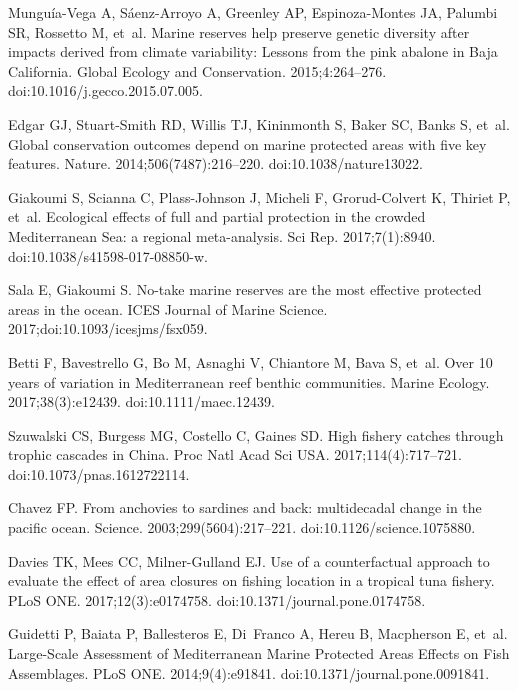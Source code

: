 \documentclass[10pt,letterpaper]{article}
\begin{document}
\begin{thebibliography}{10}
Munguía-Vega A, Sáenz-Arroyo A, Greenley AP, Espinoza-Montes JA, Palumbi SR,
  Rossetto M, et~al.
\newblock Marine reserves help preserve genetic diversity after impacts derived
  from climate variability: Lessons from the pink abalone in Baja California.
\newblock Global Ecology and Conservation. 2015;4:264--276.
\newblock doi:{10.1016/j.gecco.2015.07.005}.

Edgar GJ, Stuart-Smith RD, Willis TJ, Kininmonth S, Baker SC, Banks S, et~al.
\newblock Global conservation outcomes depend on marine protected areas with
  five key features.
\newblock Nature. 2014;506(7487):216--220.
\newblock doi:{10.1038/nature13022}.

Giakoumi S, Scianna C, Plass-Johnson J, Micheli F, Grorud-Colvert K, Thiriet P,
  et~al.
\newblock Ecological effects of full and partial protection in the crowded
  Mediterranean Sea: a regional meta-analysis.
\newblock Sci Rep. 2017;7(1):8940.
\newblock doi:{10.1038/s41598-017-08850-w}.

Sala E, Giakoumi S.
\newblock No-take marine reserves are the most effective protected areas in the
  ocean.
\newblock ICES Journal of Marine Science. 2017;doi:{10.1093/icesjms/fsx059}.

Betti F, Bavestrello G, Bo M, Asnaghi V, Chiantore M, Bava S, et~al.
\newblock Over 10 years of variation in Mediterranean reef benthic
  communities.
\newblock Marine Ecology. 2017;38(3):e12439.
\newblock doi:{10.1111/maec.12439}.

Szuwalski CS, Burgess MG, Costello C, Gaines SD.
\newblock High fishery catches through trophic cascades in China.
\newblock Proc Natl Acad Sci USA. 2017;114(4):717--721.
\newblock doi:{10.1073/pnas.1612722114}.

Chavez FP.
\newblock From anchovies to sardines and back: multidecadal change in the
  pacific ocean.
\newblock Science. 2003;299(5604):217--221.
\newblock doi:{10.1126/science.1075880}.

Davies TK, Mees CC, Milner-Gulland EJ.
\newblock Use of a counterfactual approach to evaluate the effect of area
  closures on fishing location in a tropical tuna fishery.
\newblock PLoS ONE. 2017;12(3):e0174758.
\newblock doi:{10.1371/journal.pone.0174758}.

Guidetti P, Baiata P, Ballesteros E, Di~Franco A, Hereu B, Macpherson E, et~al.
\newblock Large-Scale Assessment of Mediterranean Marine Protected Areas
  Effects on Fish Assemblages.
\newblock PLoS ONE. 2014;9(4):e91841.
\newblock doi:{10.1371/journal.pone.0091841}.


\end{thebibliography}
\end{document}
